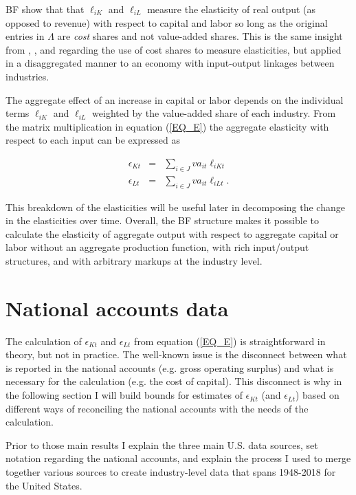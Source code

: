 \documentclass[11pt]{article}
\begin{document}
BF show that that $\ell_{iK}$ and $\ell_{iL}$ measure the elasticity of real output (as opposed to revenue) with respect to capital and labor so long as the original entries in $\Lambda$ are \textit{cost} shares and not value-added shares. This is the same insight from \cite{hall1988,hall1990}, \cite{basufernald}, and \cite{fernaldneiman2011} regarding the use of cost shares to measure elasticities, but applied in a disaggregated manner to an economy with input-output linkages between industries.

The aggregate effect of an increase in capital or labor depends on the individual terms $\ell_{iK}$ and $\ell_{iL}$ weighted by the value-added share of each industry. From the matrix multiplication in equation (\ref{EQ_E}) the aggregate elasticity with respect to each input can be expressed as

\begin{eqnarray}
	\epsilon_{Kt} &=& \sum_{i \in J} va_{it} \ell_{iKt} \\ \nonumber
	\epsilon_{Lt} &=& \sum_{i \in J} va_{it} \ell_{iLt}. \label{EQ_epsilonK}
\end{eqnarray}

This breakdown of the elasticities will be useful later in decomposing the change in the elasticities over time. Overall, the BF structure makes it possible to calculate the elasticity of aggregate output with respect to aggregate capital or labor without an  aggregate production function, with rich input/output structures, and with arbitrary markups at the industry level.

\section{National accounts data}
The calculation of $\epsilon_{Kt}$ and $\epsilon_{Lt}$ from equation (\ref{EQ_E}) is straightforward in theory, but not in practice. The well-known issue is the disconnect between what is reported in the national accounts (e.g. gross operating surplus) and what is necessary for the calculation (e.g. the cost of capital). This disconnect is why in the following section I will build bounds for estimates of $\epsilon_{Kt}$ (and $\epsilon_{Lt}$) based on different ways of reconciling the national accounts with the needs of the calculation. 

Prior to those main results I explain the three main U.S. data sources, set notation regarding the national accounts, and explain the process I used to merge together various sources to create industry-level data that spans 1948-2018 for the United States.
\end{document}
